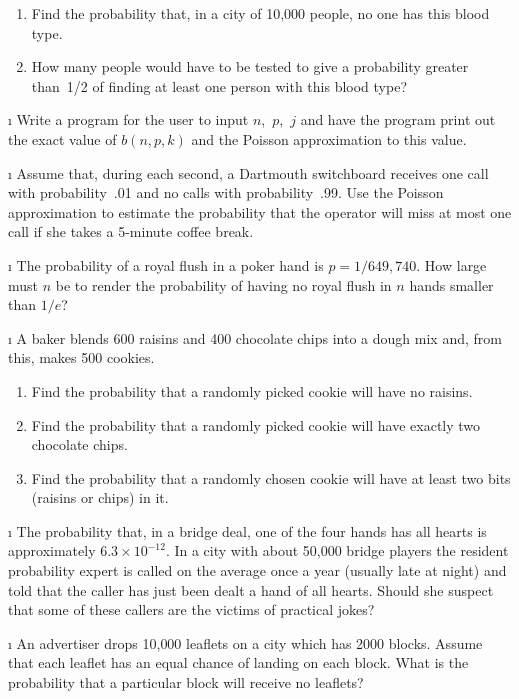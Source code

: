 \begin{LJSItem}
\begin{enumerate}
\item Find the probability that, in a city of 10{,}000 people, no one has this blood
type.

\item How many people would have to be tested to give a probability greater than~1/2
of finding at least one person with this blood type?
\end{enumerate}

\i\label{exer 5.1.110} Write a program for the user to input $n$,~$p$,~$j$ and have the
program print out the exact value of $b(n, p, k)$ and the Poisson approximation to
this value.

\i\label{exer 5.1.111} Assume that, during each second, a Dartmouth switchboard
receives one call with probability~.01 and no calls with probability~.99.  Use the
Poisson approximation to estimate the probability that the operator will miss at most
one call if she takes a 5-minute coffee break.

\i\label{exer 5.1.112} The probability of a royal flush in a poker hand is $p =
1/649{,}740$.  How large must $n$ be to render the probability of having no royal
flush in $n$ hands smaller than $1/e$?

\i\label{exer 5.1.113} A baker blends 600 raisins and 400 chocolate chips into a dough
mix and, from this, makes 500 cookies.
\begin{enumerate}
\item Find the probability that a randomly picked cookie will have no raisins.

\item Find the probability that a randomly picked cookie will have exactly two
chocolate chips.

\item Find the probability that a randomly chosen cookie will have at least two bits
(raisins or chips) in it.
\end{enumerate}

\i\label{exer 5.1.114} The probability that, in a bridge deal, one of 
the four hands has all hearts is approximately
$6.3 \times 10^{-12}$.  In a city with about 50{,}000 bridge players the resident
probability expert is called on the average once a year (usually late at night) and
told that the caller has just been dealt a hand of all hearts.  Should she suspect
that some of these callers are the victims of practical jokes?

\i\label{exer 5.1.115} An advertiser drops 10{,}000 leaflets on a city which has 2000
blocks.  Assume that each leaflet has an equal chance of landing on each block.  What
is the probability that a particular block will receive no leaflets?


\end{LJSItem}
